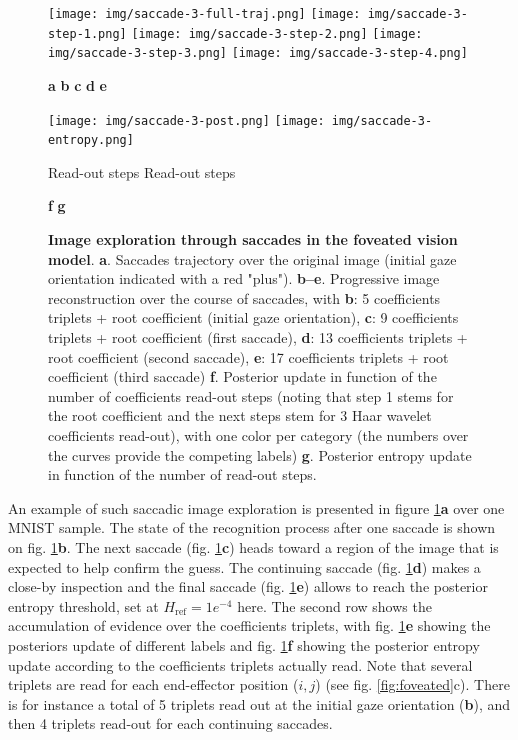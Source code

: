 \documentclass{article} %
\begin{document}
\begin{figure}[t!]
	\centerline{
		\texttt{[image: img/saccade-3-full-traj.png]} 
		\texttt{[image: img/saccade-3-step-1.png]} 
		\texttt{[image: img/saccade-3-step-2.png]} 
		\texttt{[image: img/saccade-3-step-3.png]} 
		\texttt{[image: img/saccade-3-step-4.png]}}
	\centerline{\textbf{a} \hspace{2.6cm} \textbf{b} \hspace{2.4cm} \textbf{c} \hspace{2.4cm} \textbf{d} \hspace{2.6cm} \textbf{e}}
	\centerline{\texttt{[image: img/saccade-3-post.png]} 
	\texttt{[image: img/saccade-3-entropy.png]} }
	\vspace{-.2cm}
	\centerline{Read-out steps \hspace{3.6cm} Read-out steps}
	\centerline{\textbf{f} \hspace{5.5cm} \textbf{g}}
	\caption{\textbf{Image exploration through saccades in the foveated vision model}. \textbf{a}. Saccades trajectory over the original image (initial gaze orientation indicated with a red "plus"). \textbf{b--e}. Progressive image reconstruction over the course of saccades, with \textbf{b}: 5 coefficients triplets + root coefficient (initial gaze orientation), \textbf{c}: 9 coefficients triplets + root coefficient (first saccade), \textbf{d}: 13 coefficients triplets + root coefficient (second saccade), \textbf{e}: 17 coefficients triplets + root coefficient (third saccade) \textbf{f}. Posterior update in function of the number of  coefficients read-out steps (noting that step 1 stems for the root coefficient and the next steps stem for 3 Haar wavelet coefficients read-out), with one color per category (the numbers over the curves provide the competing labels) \textbf{g}. Posterior entropy update in function of the number of read-out steps.}\label{fig:foveated-saccades}
\end{figure}


An example of such saccadic image exploration is presented in figure \ref{fig:foveated-saccades}\textbf{a} over one MNIST sample.
The state of the recognition process after one saccade is shown on fig. \ref{fig:foveated-saccades}\textbf{b}. The next saccade (fig. \ref{fig:foveated-saccades}\textbf{c})  heads toward a region of the image that is expected to help confirm the guess. The continuing saccade (fig. \ref{fig:foveated-saccades}\textbf{d}) makes a close-by inspection and the final saccade (fig. \ref{fig:foveated-saccades}\textbf{e}) allows to reach the posterior entropy threshold, set at $H_\text{ref} = 1e^{-4}$ here. The second row shows the accumulation of evidence over the coefficients triplets, with fig. \ref{fig:foveated-saccades}\textbf{e} showing the posteriors update of different labels and fig. \ref{fig:foveated-saccades}\textbf{f} showing the posterior entropy update according to the coefficients triplets actually read. Note that several triplets are read for each end-effector position ($i,j$) (see fig. \ref{fig:foveated}c). There is for instance a total of 5 triplets read out at the initial gaze orientation (\textbf{b}), and then 4 triplets read-out for each continuing saccades.
\end{document}
